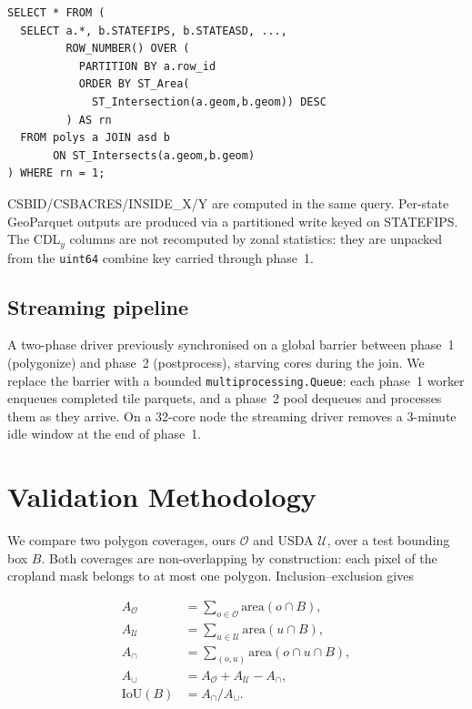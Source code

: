 \documentclass{article}
\begin{document}
\begin{verbatim}
SELECT * FROM (
  SELECT a.*, b.STATEFIPS, b.STATEASD, ...,
         ROW_NUMBER() OVER (
           PARTITION BY a.row_id
           ORDER BY ST_Area(
             ST_Intersection(a.geom,b.geom)) DESC
         ) AS rn
  FROM polys a JOIN asd b
       ON ST_Intersects(a.geom,b.geom)
) WHERE rn = 1;
\end{verbatim}

CSBID/CSBACRES/INSIDE\_X/Y are computed in the same query. Per-state
GeoParquet outputs are produced via a partitioned write keyed on
STATEFIPS. The CDL$_y$ columns are not recomputed by zonal statistics:
they are unpacked from the \texttt{uint64} combine key carried through
phase~1.

\subsection{Streaming pipeline}
\label{sec:method-streaming}

A two-phase driver previously synchronised on a global barrier between
phase~1 (polygonize) and phase~2 (postprocess), starving cores during
the join. We replace the barrier with a bounded
\texttt{multiprocessing.Queue}: each phase~1 worker enqueues completed
tile parquets, and a phase~2 pool dequeues and processes them as they
arrive. On a 32-core node the streaming driver removes a 3-minute idle window
at the end of phase~1.

\section{Validation Methodology}
\label{sec:val-method}

We compare two polygon coverages, ours $\mathcal{O}$ and USDA
$\mathcal{U}$, over a test bounding box $B$. Both coverages are
non-overlapping by construction: each pixel of the cropland mask
belongs to at most one polygon. Inclusion--exclusion gives

\begin{align}
A_\mathcal{O}    &= \textstyle\sum_{o\in\mathcal{O}} \text{area}(o \cap B), \\
A_\mathcal{U}    &= \textstyle\sum_{u\in\mathcal{U}} \text{area}(u \cap B), \\
A_\cap           &= \textstyle\sum_{(o,u)} \text{area}(o \cap u \cap B), \\
A_\cup           &= A_\mathcal{O} + A_\mathcal{U} - A_\cap, \\
\text{IoU}(B)    &= A_\cap / A_\cup.
\end{align}
\end{document}
